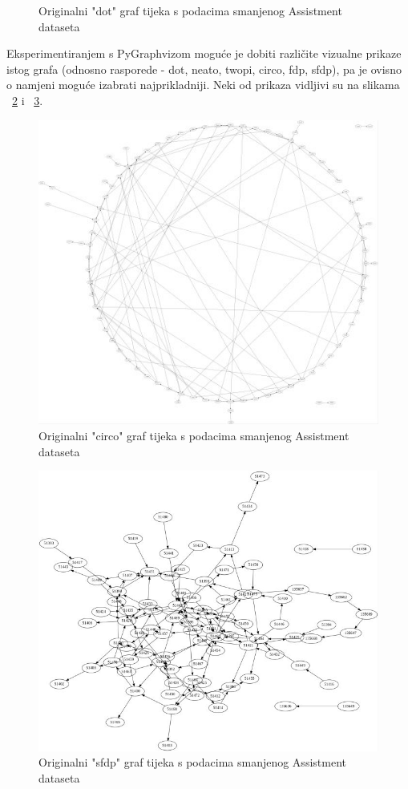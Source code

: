 \documentclass[times, utf8,projekt]{fer}
\begin{document}
\begin{itemize}
\begin{figure}[!htb]
\caption{Originalni "dot" graf tijeka s podacima smanjenog Assistment dataseta}
\label{fig:dot1}
\end{figure}
\end{itemize}

\noindent Eksperimentiranjem s PyGraphvizom moguće je dobiti različite vizualne prikaze istog grafa (odnosno rasporede - dot, neato, twopi, circo, fdp, sfdp), pa je ovisno o namjeni moguće izabrati najprikladniji. Neki od prikaza vidljivi su na slikama ~\ref{fig:circo1} i ~\ref{fig:sfdp1}.

\begin{figure}[!htb]
\centering
\includegraphics[scale=0.5]{circo1.jpg}
\caption{Originalni "circo" graf tijeka s podacima smanjenog Assistment dataseta}
\label{fig:circo1}
\end{figure}

\begin{figure}[!htb]
\centering
\includegraphics[scale=1.5]{sfdp1.jpg}
\caption{Originalni "sfdp" graf tijeka s podacima smanjenog Assistment dataseta}
\label{fig:sfdp1}
\end{figure}
\end{document}
